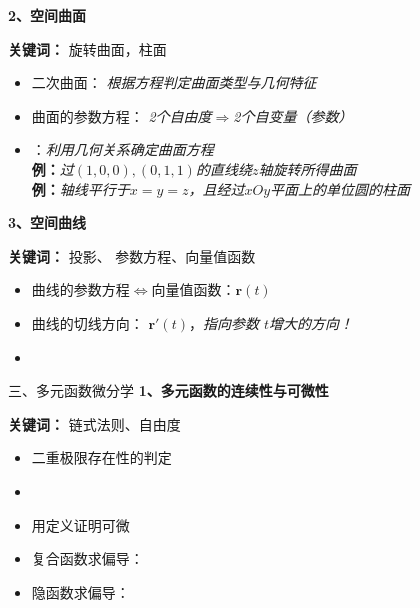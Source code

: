 \begin{frame}
	\linespread{1.2}
	{\bf 2、空间曲面} 
	
	{\b{\bf 关键词：} 旋转曲面，柱面} 
	\begin{itemize}
	  \item 二次曲面： {\it 根据方程判定曲面类型与几何特征} 
	  \item 曲面的参数方程： {\it 2个自由度$\Rightarrow $2个自变量（参数）} 
	  \item {}：{\it 利用几何关系确定曲面方程}\\
	  {{\bf 例：}\it 过$(1,0,0),(0,1,1)$的直线绕$z$轴旋转所得曲面} \\
	  {{\bf 例：}\it 轴线平行于$x=y=z$，且经过$xOy$平面上的单位圆的柱面}
	\end{itemize}
\end{frame}

\begin{frame}
	\linespread{1.2}
	{\bf 3、空间曲线} 
	
	{\b{\bf 关键词：} 投影、 参数方程、向量值函数} 
	\begin{itemize}
	  \item 曲线的参数方程$\Leftrightarrow$向量值函数：$\bm{r}(t)$ 
	  \item 曲线的切线方向： $\bm{r}'(t)$，\alert{\it 指向参数
	  $t$增大的方向！}
	  \item {}
	\end{itemize}
\end{frame}

\begin{frame}{三、多元函数微分学}
	\linespread{1.2} 
	{\bf 1、多元函数的连续性与可微性} 
	
	{\b{\bf 关键词：} 链式法则、自由度} 
	\begin{itemize}
	  \item 二重极限存在性的判定
	  \item {} 
	  \item 用定义证明可微
	  \item 复合函数求偏导：
	  \item 隐函数求偏导：
	\end{itemize}
\end{frame}

